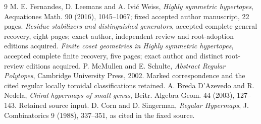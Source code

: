 \documentclass[11pt,a4paper]{article}
\begin{document}
\begin{thebibliography}{9}\small
{} M. E. Fernandes, D. Leemans and A. Ivi\'c Weiss,
\emph{Highly symmetric hypertopes}, Aequationes Math. 90 (2016),
1045--1067; fixed accepted author manuscript, 22 pages.
 \emph{Residue stabilizers and distinguished generators},
accepted complete general recovery, eight pages; exact author, independent
review and root-adoption editions acquired.
 \emph{Finite coset geometries in Highly symmetric hypertopes},
accepted complete finite recovery, five pages; exact author and distinct
root-review editions acquired.
 P. McMullen and E. Schulte, \emph{Abstract Regular Polytopes},
Cambridge University Press, 2002. Marked correspondence and the cited regular
locally toroidal classifications retained.
 A. Breda D'Azevedo and R. Nedela, \emph{Chiral hypermaps of small
genus}, Beitr. Algebra Geom. 44 (2003), 127--143. Retained source input.
 D. Corn and D. Singerman, \emph{Regular Hypermaps},
J. Combinatorics 9 (1988), 337--351, as cited in the fixed source.
\end{thebibliography}
\end{document}
